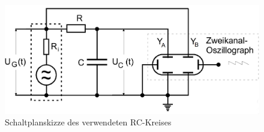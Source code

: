 \begin{figure}
  \includegraphics[width=\textwidth]{Aufbau_V353.PNG}
  \caption{Schaltplanskizze des verwendeten RC-Kreises}
  \label{fig:Aufbau}
\end{figure}


